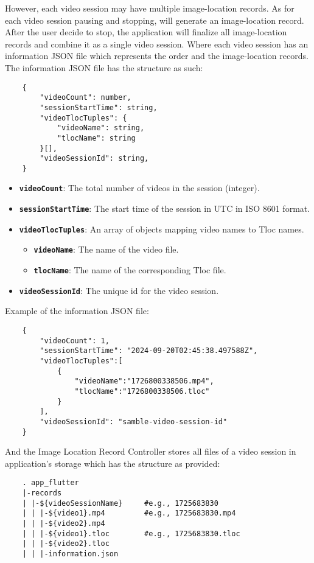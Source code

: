 \begin{enumerate}
However, each video session may have multiple image-location records. As for each video session pausing and stopping, will generate an image-location record. After the user decide to stop, the application will finalize all image-location records and combine it as a single video session. Where each video session has an information JSON file which represents the order and the image-location records. The information JSON file has the structure as such:
\begin{lstlisting}
    {
        "videoCount": number,
        "sessionStartTime": string,
        "videoTlocTuples": {
            "videoName": string, 
            "tlocName": string 
        }[],
        "videoSessionId": string,
    }
\end{lstlisting}
\begin{itemize}
    \item \textbf{\texttt{videoCount}}: The total number of videos in the session (integer).
    \item \textbf{\texttt{sessionStartTime}}: The start time of the session in UTC in ISO 8601 format.
    \item \textbf{\texttt{videoTlocTuples}}: An array of objects mapping video names to Tloc names.
    \begin{itemize}
        \item \textbf{\texttt{videoName}}: The name of the video file.
        \item \textbf{\texttt{tlocName}}: The name of the corresponding Tloc file.
    \end{itemize}
    \item \textbf{\texttt{videoSessionId}}: The unique id for the video session.
\end{itemize}
Example of the information JSON file:
\begin{lstlisting}
    {
        "videoCount": 1,
        "sessionStartTime": "2024-09-20T02:45:38.497588Z",
        "videoTlocTuples":[
            {
                "videoName":"1726800338506.mp4",
                "tlocName":"1726800338506.tloc"
            }
        ],
        "videoSessionId": "samble-video-session-id"
    }
\end{lstlisting}
And the Image Location Record Controller stores all files of a video session in application's storage which has the structure as provided:
\begin{lstlisting}
    . app_flutter
    |-records
    | |-${videoSessionName}     #e.g., 1725683830
    | | |-${video1}.mp4         #e.g., 1725683830.mp4
    | | |-${video2}.mp4
    | | |-${video1}.tloc        #e.g., 1725683830.tloc
    | | |-${video2}.tloc
    | | |-information.json
\end{lstlisting}
\end{enumerate}
